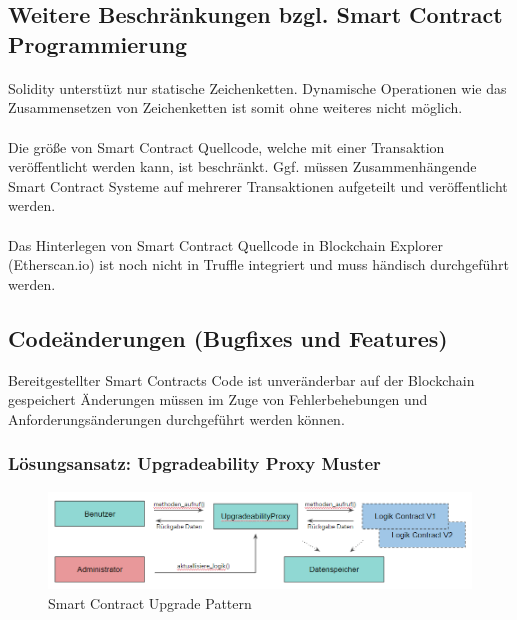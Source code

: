 \subsection{Weitere Beschränkungen bzgl. Smart Contract Programmierung}

\paragraph*{}
Solidity unterstüzt nur statische Zeichenketten. Dynamische Operationen wie das Zusammensetzen von Zeichenketten ist somit ohne weiteres nicht möglich.

\paragraph*{}
Die größe von Smart Contract Quellcode, welche mit einer Transaktion veröffentlicht werden kann, ist beschränkt. Ggf. müssen Zusammenhängende Smart Contract Systeme auf mehrerer Transaktionen aufgeteilt und veröffentlicht werden.

\paragraph*{}
Das Hinterlegen von Smart Contract Quellcode in  Blockchain Explorer (Etherscan.io) ist noch nicht in Truffle integriert und muss händisch durchgeführt werden.


\subsection*{Codeänderungen (Bugfixes und Features)}
Bereitgestellter Smart Contracts Code ist unveränderbar auf der Blockchain gespeichert
Änderungen müssen im Zuge von Fehlerbehebungen und Anforderungsänderungen durchgeführt werden können.

\subsubsection*{Lösungsansatz: Upgradeability Proxy Muster}

\begin{figure}[H]
    \centering
    \includegraphics[width=6.0in]{images/pattern-upgrade.png}
    \caption{Smart Contract Upgrade Pattern}
    \label{fig:asure_architecture}
\end{figure}


